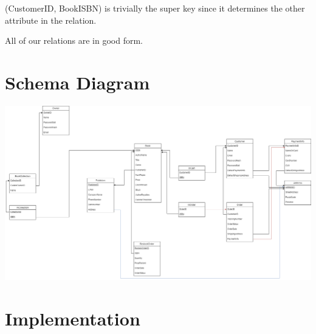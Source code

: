 \documentclass{article}
\begin{document}
(CustomerID, BookISBN) is trivially the super key since it determines the other attribute in the relation.

All of our relations are in good form.

\section{Schema Diagram}

\begin{landscape}
\includegraphics[height=\textwidth]{schema}
\end{landscape}

\section{Implementation}
\end{document}

